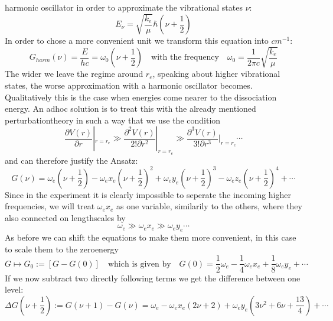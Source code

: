 harmonic oscillator in order to approximate
the vibrational states $\nu$:
\begin{equation}
    E_\nu =\sqrt{\frac{k_e}{\mu}}\hbar \left (\nu
        + \frac{1}{2}\right )
\end{equation}
In order to chose a more convenient unit we transform this
equation into $cm^{-1}$:
\begin{equation}
    G_{harm}(\nu) = \frac{E}{hc} = \omega_0 (\nu + \frac{1}{2})
    \quad \text{with the frequency} \quad
    \omega_0 = \frac{1}{2\pi c} \sqrt{\frac{k_e}{\mu}}
\end{equation}
The wider we leave the regime around $r_e$, speaking about 
higher vibrational states, the worse approximation with a harmonic
oscillator becomes. Qualitatively this is the case when energies
come nearer to the dissociation energy. An adhoc solution is 
to treat this with the already mentioned perturbationtheory in such
a way that we use the condition
\begin{equation}
    \frac{\partial V(r)}{\partial r}|_{r=r_e}        \gg
    \frac{\partial^2 V(r)}{2!\partial r^2}|_{r=r_e}  \gg
    \frac{\partial^3 V(r)}{3!\partial r^3}|_{r=r_e}  
    \cdots
\end{equation}
and can therefore justify the Ansatz:
\begin{equation}
    G(\nu) = \omega_e (\nu + \frac{1}{2} ) 
    - \omega_e x_e (\nu + \frac{1}{2} ) ^2 
    + \omega_e y_e (\nu + \frac{1}{2} ) ^3 
    - \omega_e z_e (\nu + \frac{1}{2} ) ^4 
    + \cdots 
\end{equation}
Since in the experiment it is clearly impossible to seperate
the incoming higher frequencies, we will treat $\omega_e x_e$ as 
one variable, similarily to the others, where they also connected
on lengthscales by
\begin{equation}
    \omega_e \gg \omega_ex_e \gg \omega_e y_e \cdots 
\end{equation}
As before we can shift the equations to make them more convenient,
in this case to scale them to the zeroenergy
\begin{equation}
    G \mapsto G_0 := \left [G-G(0) \right ] 
        \quad \text{which is given by}
    \quad G(0)=\frac{1}{2}\omega_e - \frac{1}{4}\omega_e x_e 
    + \frac{1}{8} \omega_e y_e + \cdots 
\end{equation}
If we now subtract two directly following terms we get the 
difference between one level:
\begin{equation}
    \Delta G(\nu +\frac{1}{2}) := G(\nu +1 ) - G(\nu) 
    = \omega_e - \omega_e x_e \left (2\nu +2\right ) + \omega_e y_e 
    \left (3\nu^2+ 6\nu + \frac{13}{4} 
        \right) + \cdots 
\end{equation} 
